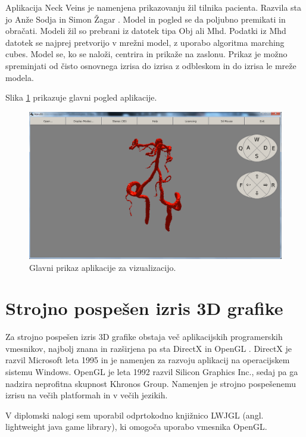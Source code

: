 \documentclass[a4paper, 12pt]{book}
\begin{document}
Aplikacija Neck Veins je namenjena prikazovanju žil tilnika pacienta. Razvila sta jo Anže Sodja \cite{sodja} in Simon Žagar \cite{zagar}. Model in pogled se da poljubno premikati in obračati. Modeli žil so prebrani iz datotek tipa Obj ali Mhd. Podatki iz Mhd datotek se najprej pretvorijo v mrežni model, z uporabo algoritma marching cubes.  Model se, ko se naloži, centrira in prikaže na zaslonu. Prikaz je možno spreminjati od čisto osnovnega izrisa do izrisa z odbleskom in do izrisa le mreže modela.

Slika \ref{aplikacija} prikazuje glavni pogled aplikacije. 

\begin{figure}[h!]
\begin{center}
\includegraphics[width=14cm]{Aplikacija.png}
\end{center}
\caption{Glavni prikaz aplikacije za vizualizacijo.}
\label{aplikacija}
\end{figure}

\section{Strojno pospešen izris 3D grafike}
Za strojno pospešen izris 3D grafike obstaja več aplikacijskih programerskih vmesnikov, najbolj znana in razširjena pa sta DirectX \cite{DirectX} in OpenGL \cite{OpenGL}. DirectX je razvil Microsoft leta 1995 in je namenjen za razvoju aplikacij na operacijskem sistemu Windows. OpenGL je leta 1992 razvil Silicon Graphics Inc., sedaj pa ga nadzira neprofitna skupnost Khronos Group. Namenjen je strojno pospešenemu izrisu na večih platformah in v večih jezikih. 

V diplomski nalogi sem uporabil odprtokodno knjižnico LWJGL (angl. lightweight java game library), ki omogoča uporabo vmesnika OpenGL.
\end{document}
